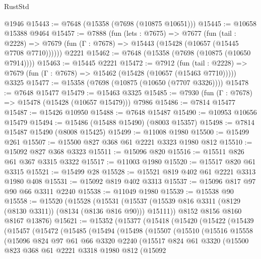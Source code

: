 \begin{lexlean}{RustStd}
\begin{coremodule}
    @1946
@15443 := @7648 (@15358 (@7698 (@10875 @10651)))
@15445 := @10658 @15388 @9464
@15457 := @7888
    (fun (lets : @7675) =>
    @7677
      (fun (tail : @2228) =>
      @7679 (fun (Γ : @7678) => @15443 (@15428 (@10657 (@15445 @7708 @7710))))))
    @2221
@15462 := @7648 (@15358 (@7698 (@10875 (@10650 @7914))))
@15463 := @15445 @2221
@15472 := @7912
    (fun (tail : @2228) => @7679 (fun (Γ : @7678) => @15462 (@15428 (@10657 (@15463 @7710)))))
    @3325
@15477 := @15358 (@7698 (@10875 (@10650 (@7707 @3326))))
@15478 := @7648 @15477
@15479 := @15463 @3325
@15485 := @7930 (fun (Γ : @7678) => @15478 (@15428 (@10657 @15479))) @7986
@15486 := @7814 @15477
@15487 := @15426 @10950
@15488 := @7648 @15487
@15490 := @10953 @10656 @15479
@15494 := @15486 (@15488 @15490) (@8003 @15357)
@15498 := @7814 @15487 @15490 (@8008 @15425)
@15499 := @11008 @1980
@15500 := @15499 @261
@15507 := @15500 @827 @368 @61 @2221 @3323 @1980 @812
@15510 := @15092 @827 @368 @3323
@15511 := @15096 @820
@15516 := @15511 @826 @61 @367 @3315 @3322
@15517 := @11003 @1980
@15520 := @15517 @820 @61 @3315
@15521 := @15499 @28
@15528 := @15521 @819 @402 @61 @2221 @3313 @1980 @408
@15531 := @15092 @819 @402 @3313
@15537 := @15096 @817 @97 @90 @66 @3311 @2240
@15538 := @11049 @1980
@15539 := @15538 @90
@15558 := @15520
    (@15528
      (@15531 (@15537 (@15539 @816 @3311 (@8129 (@8130 @3311)) (@8134 (@8136 @816 @90))) @15111))
      @8152
      @8156
      @8160
      @8167
      @13876)
@15621 := @15352
    (@15377
      (@15418
        (@15420
          (@15422
            (@15439
              (@15457
                (@15472
                  (@15485
                    (@15494
                      (@15498
                        (@15507
                          (@15510
                            (@15516
                              @15558
                              (@15096
                                @824
                                @97
                                @61
                                @66
                                @3320
                                @2240
                                (@15517
                                  @824
                                  @61
                                  @3320
                                  (@15500
                                    @823
                                    @368
                                    @61
                                    @2221
                                    @3318
                                    @1980
                                    @812
                                    (@15092

\end{coremodule}
\end{lexlean}
